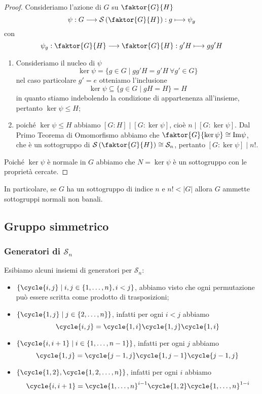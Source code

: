 \documentclass[11pt]{scrartcl}
\begin{document}
\begin{proof}
    Consideriamo l'azione di $G$ su $\faktor{G}{H}$
    \[
        \psi: G\longrightarrow\mathcal{S}\left(\faktor{G}{H}\right):g\longmapsto \psi_g
    \]
    con
    \[
        \psi_g:\faktor{G}{H}\longrightarrow\faktor{G}{H} : g'H\longmapsto gg'H
    \]
    \begin{enumerate}[(1)]
        \item Consideriamo il nucleo di $\psi$
        \[
            \ker\psi = \{g \in G\mid gg'H = g'H~\forall g' \in G\}
        \]
        nel caso particolare $g' = e$ otteniamo l'inclusione
        \[
            \ker\psi \subseteq \{g \in G \mid gH = H\} = H
        \]
        in quanto stiamo indebolendo la condizione di appartenenza all'insieme,
        pertanto $\ker\psi \leqslant H$;
        \item poiché $\ker\psi \leqslant H$ abbiamo $[G:H]\mid [G:\ker\psi]$, cioè
        $n \mid [G:\ker\psi]$. Dal Primo Teorema di Omomorfismo abbiamo che
        $\faktor{G}{\ker\psi} \cong \mathrm{Im\psi}$, che è un sottogruppo
        di $\mathcal{S}\left(\faktor{G}{H}\right)\cong \mathcal{S}_n$, pertanto $[G:\ker\psi]\mid n!$.
    \end{enumerate}
    Poiché $\ker\psi$ è normale in $G$ abbiamo che $N = \ker\psi$ è un sottogruppo
    con le proprietà cercate.
\end{proof}

\begin{remark}
    In particolare, se $G$ ha un sottogruppo di indice $n$ e $n! < |G|$
    allora $G$ ammette sottogruppi normali non banali.
\end{remark}

\newpage

\subsection{Gruppo simmetrico}

\subsubsection{Generatori di $\mathcal{S}_n$}

Esibiamo alcuni insiemi di generatori per $\mathcal{S}_n$:

\begin{itemize}
    \item $\{\cycle{i, j} \mid i, j \in\{1, \ldots, n\}, i < j\}$, abbiamo visto 
    che ogni permutazione può essere scritta come prodotto di trasposizioni;
    \item $\{\cycle{1, j}\mid j \in \{2, \ldots, n\}\}$, infatti per ogni $i<j$ abbiamo
    \[
        \cycle{i, j} = \cycle{1, i}\cycle{1, j}\cycle{1, i}
    \]
    \item $\{\cycle{i, i + 1}\mid i \in\{1, \ldots, n - 1\}\}$,
    infatti per ogni $j$ abbiamo 
    \[
        \cycle{1, j} = \cycle{j - 1, j}\cycle{1, j - 1}\cycle{j - 1, j}
    \]
    \item $\{\cycle{1, 2}, \cycle{1, 2, \ldots, n}\}$, infatti per ogni
    $i$ abbiamo 
    \[
        \cycle{i, i + 1} = \cycle{1, \ldots, n}^{i - 1}\cycle{1, 2}\cycle{1, \ldots, n}^{1 - i}
    \]
\end{itemize}
\end{document}
